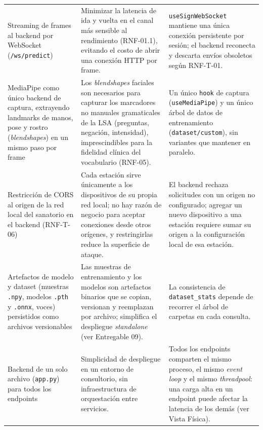 \begin{longtable}{>{\raggedright\arraybackslash}p{4.25cm} >{\raggedright\arraybackslash}p{5.2cm} >{\raggedright\arraybackslash}p{5.2cm}}
    Streaming de frames al backend por WebSocket (\texttt{/ws/predict}) &
    Minimizar la latencia de ida y vuelta en el canal más sensible al
    rendimiento (RNF-01.1), evitando el costo de abrir una conexión HTTP por
    frame. &
    \texttt{useSignWebSocket} mantiene una única conexión persistente por
    sesión; el backend reconecta y descarta envíos obsoletos según
    RNF-T-01. \\

    MediaPipe como único backend de captura, extrayendo landmarks de manos,
    pose y rostro (\textit{blendshapes}) en un mismo paso por frame &
    Los \textit{blendshapes} faciales son necesarios para capturar los
    marcadores no manuales gramaticales de la LSA (preguntas, negación,
    intensidad), imprescindibles para la fidelidad clínica del vocabulario
    (RNF-05). &
    Un único \texttt{hook} de captura (\texttt{useMediaPipe}) y un único
    árbol de datos de entrenamiento (\texttt{dataset/custom}), sin
    variantes que mantener en paralelo. \\

    Restricción de CORS al origen de la red local del sanatorio en el
    backend (RNF-T-06) &
    Cada estación sirve únicamente a los dispositivos de su propia red
    local; no hay razón de negocio para aceptar conexiones desde otros
    orígenes, y restringirlas reduce la superficie de ataque. &
    El backend rechaza solicitudes con un origen no configurado; agregar un
    nuevo dispositivo a una estación requiere sumar su origen a la
    configuración local de esa estación. \\

    Artefactos de modelo y dataset (muestras \texttt{.npy}, modelos
    \texttt{.pth} y \texttt{.onnx}, voces) persistidos como archivos
    versionables &
    Las muestras de entrenamiento y los modelos son artefactos binarios
    que se copian, versionan y reemplazan por archivo; simplifica el
    despliegue \textit{standalone} (ver Entregable 09). &
    La consistencia de \texttt{dataset\_stats} depende de recorrer el árbol
    de carpetas en cada consulta. \\

    Backend de un solo archivo (\texttt{app.py}) para todos los endpoints &
    Simplicidad de despliegue en un entorno de consultorio, sin
    infraestructura de orquestación entre servicios. &
    Todos los endpoints comparten el mismo proceso, el mismo \textit{event
    loop} y el mismo \textit{threadpool}: una carga alta en un endpoint
    puede afectar la latencia de los demás (ver Vista Física). \\


\end{longtable}
